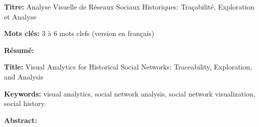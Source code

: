 \documentclass[12pt,a4paper, twoside]{book}
\begin{document}
    \small

    \begin{mdframed}[linecolor=Prune,linewidth=1]

        \textbf{Titre:} Analyse Visuelle de Réseaux Sociaux Historiques: Traçabilité, Exploration et Analyse

        \noindent \textbf{Mots clés:} 3 à 6 mots clefs (version en français)

        \vspace{-.5cm}
        \begin{multicols}{2}
            \noindent \textbf{Résumé:}
        \end{multicols}

    \end{mdframed}

    \vspace{8mm}

    \begin{mdframed}[linecolor=Prune,linewidth=1]

        \textbf{Title:} Visual Analytics for Historical Social Networks: Traceability, Exploration, and Analysis

        \noindent \textbf{Keywords:} visual analytics, social network analysis, social network visualization, social history.

            \noindent \textbf{Abstract:} 
    \end{mdframed}

    \titleformat{\chapter}[hang]{\bfseries\LARGE\color{Prune}}{\thechapter\quad}{.1ex}{}{}%
    \titlespacing{\chapter}{0pc}{0ex}{0.5pc}
\end{document}

